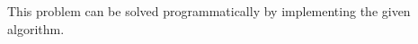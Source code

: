 \texttt{\SOLNCODE{}}

This problem can be solved programmatically by implementing the given algorithm. 